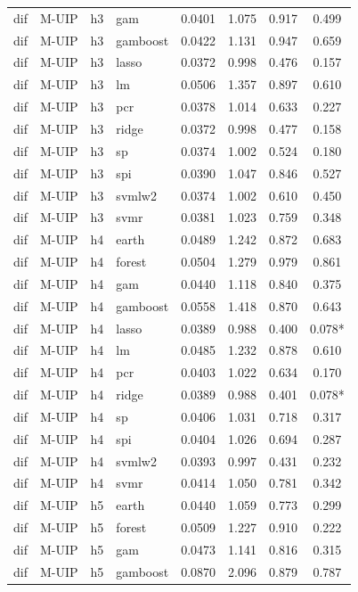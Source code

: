 \begin{ThreePartTable}
\begin{longtable}[t]{llclcccc}
dif & M-UIP & h3 & gam & 0.0401 & 1.075 & 0.917 & 0.499\\
dif & M-UIP & h3 & gamboost & 0.0422 & 1.131 & 0.947 & 0.659\\
dif & M-UIP & h3 & lasso & 0.0372 & 0.998 & 0.476 & 0.157\\
dif & M-UIP & h3 & lm & 0.0506 & 1.357 & 0.897 & 0.610\\
dif & M-UIP & h3 & pcr & 0.0378 & 1.014 & 0.633 & 0.227\\
dif & M-UIP & h3 & ridge & 0.0372 & 0.998 & 0.477 & 0.158\\
dif & M-UIP & h3 & sp & 0.0374 & 1.002 & 0.524 & 0.180\\
dif & M-UIP & h3 & spi & 0.0390 & 1.047 & 0.846 & 0.527\\
dif & M-UIP & h3 & svmlw2 & 0.0374 & 1.002 & 0.610 & 0.450\\
dif & M-UIP & h3 & svmr & 0.0381 & 1.023 & 0.759 & 0.348\\
\addlinespace
dif & M-UIP & h4 & earth & 0.0489 & 1.242 & 0.872 & 0.683\\
dif & M-UIP & h4 & forest & 0.0504 & 1.279 & 0.979 & 0.861\\
dif & M-UIP & h4 & gam & 0.0440 & 1.118 & 0.840 & 0.375\\
dif & M-UIP & h4 & gamboost & 0.0558 & 1.418 & 0.870 & 0.643\\
dif & M-UIP & h4 & lasso & 0.0389 & 0.988 & 0.400 & 0.078*\\
dif & M-UIP & h4 & lm & 0.0485 & 1.232 & 0.878 & 0.610\\
dif & M-UIP & h4 & pcr & 0.0403 & 1.022 & 0.634 & 0.170\\
dif & M-UIP & h4 & ridge & 0.0389 & 0.988 & 0.401 & 0.078*\\
dif & M-UIP & h4 & sp & 0.0406 & 1.031 & 0.718 & 0.317\\
dif & M-UIP & h4 & spi & 0.0404 & 1.026 & 0.694 & 0.287\\
dif & M-UIP & h4 & svmlw2 & 0.0393 & 0.997 & 0.431 & 0.232\\
dif & M-UIP & h4 & svmr & 0.0414 & 1.050 & 0.781 & 0.342\\
\addlinespace
dif & M-UIP & h5 & earth & 0.0440 & 1.059 & 0.773 & 0.299\\
dif & M-UIP & h5 & forest & 0.0509 & 1.227 & 0.910 & 0.222\\
dif & M-UIP & h5 & gam & 0.0473 & 1.141 & 0.816 & 0.315\\
dif & M-UIP & h5 & gamboost & 0.0870 & 2.096 & 0.879 & 0.787\\

\end{longtable}
\end{ThreePartTable}
